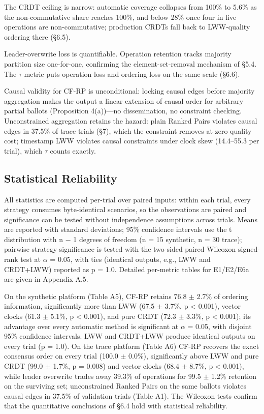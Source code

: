 \documentclass[journal]{IEEEtran}
\begin{document}
The CRDT ceiling is narrow: automatic coverage collapses from 100\% to 5.6\% as the non-commutative share reaches 100\%, and below 28\% once four in five operations are non-commutative; production CRDTs fall back to LWW-quality ordering there (§6.5).

Leader-overwrite loss is quantifiable. Operation retention tracks majority partition size one-for-one, confirming the element-set-removal mechanism of §5.4. The $\tau$ metric puts operation loss and ordering loss on the same scale (§6.6).

Causal validity for CF-RP is unconditional: locking causal edges before majority aggregation makes the output a linear extension of causal order for arbitrary partial ballots (Proposition 4(a))—no dissemination, no constraint checking. Unconstrained aggregation retains the hazard: plain Ranked Pairs violates causal edges in 37.5\% of trace trials (§7), which the constraint removes at zero quality cost; timestamp LWW violates causal constraints under clock skew (14.4–55.3 per trial), which $\tau$ counts exactly.

\subsection{Statistical Reliability}
All statistics are computed per-trial over paired inputs: within each trial, every strategy consumes byte-identical scenarios, so the observations are paired and significance can be tested without independence assumptions across trials. Means are reported with standard deviations; 95\% confidence intervals use the t distribution with n $-$ 1 degrees of freedom (n = 15 synthetic, n = 30 trace); pairwise strategy significance is tested with the two-sided paired Wilcoxon signed-rank test at $\alpha$ = 0.05, with ties (identical outputs, e.g., LWW and CRDT+LWW) reported as p = 1.0. Detailed per-metric tables for E1/E2/E6a are given in Appendix A.5.

On the synthetic platform (Table A5), CF-RP retains 76.8 $\pm$ 2.7\% of ordering information, significantly more than LWW (67.5 $\pm$ 3.7\%, p < 0.001), vector clocks (61.3 $\pm$ 5.1\%, p < 0.001), and pure CRDT (72.3 $\pm$ 3.3\%, p < 0.001); its advantage over every automatic method is significant at $\alpha$ = 0.05, with disjoint 95\% confidence intervals. LWW and CRDT+LWW produce identical outputs on every trial (p = 1.0). On the trace platform (Table A6) CF-RP recovers the exact consensus order on every trial (100.0 $\pm$ 0.0\%), significantly above LWW and pure CRDT (99.0 $\pm$ 1.7\%, p = 0.008) and vector clocks (68.4 $\pm$ 8.7\%, p < 0.001), while leader overwrite trades away 39.3\% of operations for 99.5 $\pm$ 1.2\% retention on the surviving set; unconstrained Ranked Pairs on the same ballots violates causal edges in 37.5\% of validation trials (Table A1). The Wilcoxon tests confirm that the quantitative conclusions of §6.4 hold with statistical reliability.
\end{document}

